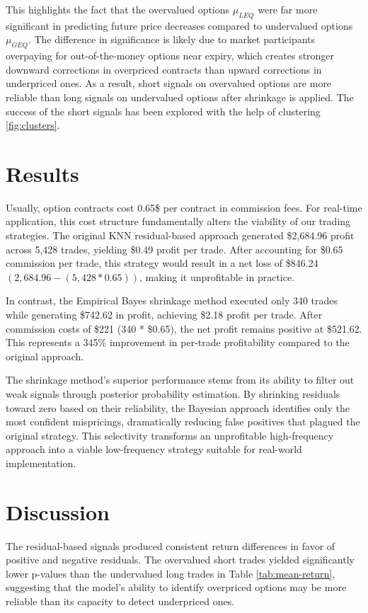 \documentclass{article}
\begin{document}
This highlights the fact that the overvalued options $\mu_{LEQ}$ were far more significant in predicting future price decreases compared to undervalued options $\mu_{GEQ}$. The difference in significance is likely due to market participants overpaying for out-of-the-money options near expiry, which creates stronger downward corrections in overpriced contracts than upward corrections in underpriced ones. As a result, short signals on overvalued options are more reliable than long signals on undervalued options after shrinkage is applied. The success of the short signals has been explored with the help of clustering \ref{fig:clusters}.

\section{Results}

Usually, option contracts cost 0.65\$ per contract in commission fees. For real-time application, this cost structure fundamentally alters the viability of our trading strategies. The original KNN residual-based approach generated \$2,684.96 profit across 5,428 trades, yielding \$0.49 profit per trade. After accounting for \$0.65 commission per trade, this strategy would result in a net loss of \$846.24 $(2,684.96 - (5,428 * 0.65))$, making it unprofitable in practice.

In contrast, the Empirical Bayes shrinkage method executed only 340 trades while generating \$742.62 in profit, achieving \$2.18 profit per trade. After commission costs of \$221 (340 * \$0.65), the net profit remains positive at \$521.62. This represents a 345\% improvement in per-trade profitability compared to the original approach.

The shrinkage method's superior performance stems from its ability to filter out weak signals through posterior probability estimation. By shrinking residuals toward zero based on their reliability, the Bayesian approach identifies only the most confident mispricings, dramatically reducing false positives that plagued the original strategy. This selectivity transforms an unprofitable high-frequency approach into a viable low-frequency strategy suitable for real-world implementation. 


\section{Discussion}

The residual-based signals produced consistent return differences in favor of positive and negative residuals. The overvalued short trades yielded significantly lower p-values than the undervalued long trades in Table \ref{tab:mean-return}, suggesting that the model's ability to identify overpriced options may be more reliable than its capacity to detect underpriced ones.
\end{document}
